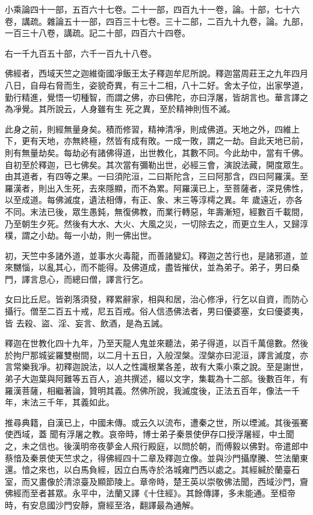 \begin{pinyinscope}
 小乘論四十一部，五百六十七卷。二十一部，四百九十一卷，論。十部，七十六卷，講疏。雜論五十一部，四百三十七卷。三十二部，二百九十九卷，論。九部，一百三十八卷，講疏。記二十部，四百六十四卷。



 右一千九百五十部，六千一百九十八卷。



 佛經者，西域天竺之迦維衛國凈飯王太子釋迦牟尼所說。釋迦當周莊王之九年四月八日，自母右脅而生，姿貌奇異，有三十二相，八十二好。舍太子位，出家學道，勤行精進，覺悟一切種智，而謂之佛，亦曰佛陀，亦曰浮屠，皆胡言也。華言譯之為凈覺。其所說云，人身雖有生
 死之異，至於精神則恆不滅。



 此身之前，則經無量身矣。積而修習，精神清凈，則成佛道。天地之外，四維上下，更有天地，亦無終極，然皆有成有敗。一成一敗，謂之一劫。自此天地已前，則有無量劫矣。每劫必有諸佛得道，出世教化，其數不同。今此劫中，當有千佛。自初至於釋迦，已七佛矣。其次當有彌勒出世，必經三會，演說法藏，開度眾生。由其道者，有四等之果。一曰須陀洹，二曰斯陀含，三曰阿那含，四曰阿羅漢。至羅漢者，則出入生死，去來隱顯，而不為累。阿羅漢已上，至菩薩者，深見佛性，以至成道。每佛滅度，遺法相傳，有正、象、末三等淳樗之異。年
 歲遠近，亦各不同。末法已後，眾生愚鈍，無復佛教，而業行轉惡，年壽漸短，經數百千載間，乃至朝生夕死。然後有大水、大火、大風之災，一切除去之，而更立生人，又歸淳樸，謂之小劫。每一小劫，則一佛出世。



 初，天竺中多諸外道，並事水火毒龍，而善諸變幻。釋迦之苦行也，是諸邪道，並來嬲惱，以亂其心，而不能得。及佛道成，盡皆摧伏，並為弟子。弟子，男曰桑門，譯言息心，而總曰僧，譯言行乞。



 女曰比丘尼。皆剃落須發，釋累辭家，相與和居，治心修凈，行乞以自資，而防心攝行。僧至二百五十戒，尼五百戒。俗人信憑佛法者，男曰優婆塞，女曰優婆夷，皆
 去殺、盜、淫、妄言、飲酒，是為五誡。



 釋迦在世教化四十九年，乃至天龍人鬼並來聽法，弟子得道，以百千萬億數。然後於拘尸那城娑羅雙樹間，以二月十五日，入般涅槃。涅槃亦曰泥洹，譯言滅度，亦言常樂我凈。初釋迦說法，以人之性識根業各差，故有大乘小乘之說。至是謝世，弟子大迦葉與阿難等五百人，追共撰述，綴以文字，集載為十二部。後數百年，有羅漢菩薩，相繼著論，贊明其義。然佛所說，我滅度後，正法五百年，像法一千年，末法三千年，其義如此。



 推尋典籍，自漢已上，中國未傳。或云久以流布，遭秦之世，所以堙滅。其後張騫使西域，蓋
 聞有浮屠之教。哀帝時，博士弟子秦景使伊存口授浮屠經，中土聞之，未之信也。後漢明帝夜夢金人飛行殿庭，以問於朝，而傅毅以佛對。帝遣郎中蔡愔及秦景使天竺求之，得佛經四十二章及釋迦立像。並與沙門攝摩騰、竺法蘭東還。愔之來也，以白馬負經，因立白馬寺於洛城雍門西以處之。其經緘於蘭臺石室，而又畫像於清涼臺及顯節陵上。章帝時，楚王英以崇敬佛法聞，西域沙門，齎佛經而至者甚眾。永平中，法蘭又譯《十住經》。其餘傳譯，多未能通。至桓帝時，有安息國沙門安靜，齎經至洛，翻譯最為通解。




\end{pinyinscope}
